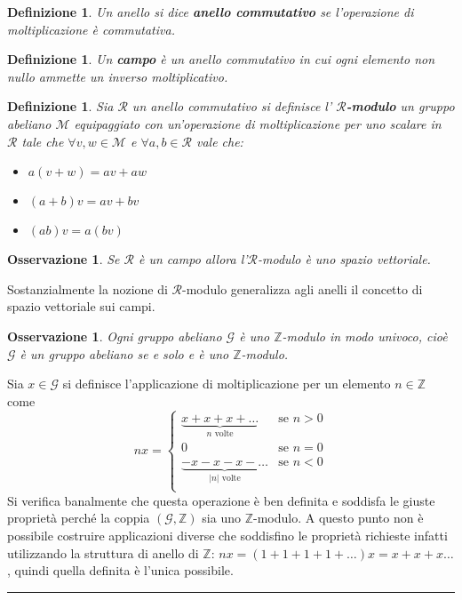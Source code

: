 \documentclass[10pt, twoside=false, x11names]{scrbook}
\newtheorem{osservation}[theorem]{Osservazione}
\newtheorem{definition}[theorem]{Definizione}
\newenvironment{proof}{{\textbf{Dimostrazione}:}}{\hfill\rule{2mm}{2mm} \newline}
\newcommand{\R}{\mathcal{R}}
\newcommand{\M}{\mathcal{M}}
\newcommand{\Z}{\mathbb{Z}}
\begin{document}
\begin{definition}
  Un anello si dice \textbf{anello commutativo}  se l'operazione di moltiplicazione
  è commutativa.
\end{definition}

\begin{definition}
  Un \textbf{campo}  è un anello commutativo in cui ogni elemento non nullo ammette
  un inverso moltiplicativo.
\end{definition}

\begin{definition}
  Sia $ \R $ un anello commutativo si definisce l' \textbf{$ \R $-modulo} \index{$ \R $-modulo}
  un gruppo abeliano $ \M $ equipaggiato con un'operazione di moltiplicazione per uno scalare in $ \R $
  tale che $ \forall v,w \in \M $ e $ \forall a,b \in \R $ vale che:
  \begin{itemize}
  \item $ a(v + w) = av + aw $
  \item $ (a + b)v = av + bv $
  \item $ (ab)v = a(bv) $
  \end{itemize}
\end{definition}

\begin{osservation}
  Se $ \R $ è un campo allora l'$ \R $-modulo è uno spazio vettoriale.
\end{osservation}
Sostanzialmente la nozione di $ \R $-modulo generalizza agli anelli il concetto di spazio vettoriale sui campi.

\begin{osservation}
  Ogni gruppo abeliano $ \mathcal{G} $ è uno $ \Z $-modulo in modo univoco, cioè $ \mathcal{G} $ è un
  gruppo abeliano se e solo e è uno $ \Z $-modulo.
\end{osservation}
\begin{proof}
  Sia $ x \in \mathcal{G} $ si definisce l'applicazione di moltiplicazione per un elemento $ n \in \Z $ come
  \[
    nx =
    \begin{cases}
      \underbrace{ x + x + x + \dots}_{n \text{ volte}} & \text{se } n > 0 \\
      0 & \text{se } n = 0 \\
       \underbrace{ - x - x - x - \dots}_{|n| \text{ volte}} & \text{se } n < 0 \\
    \end{cases}
  \]
  Si verifica banalmente che questa operazione è ben definita e soddisfa
  le giuste proprietà perché la coppia $ (\mathcal{G}, \Z) $ sia uno $ \Z $-modulo.
  A questo punto non è possibile costruire applicazioni diverse che soddisfino le
  proprietà richieste infatti utilizzando la struttura di anello di $ \Z $:
  $ n x = (1 + 1 + 1 + 1 + \dots) x = x + x + x \dots $, quindi quella definita
  è l'unica possibile.
\end{proof}
\end{document}
